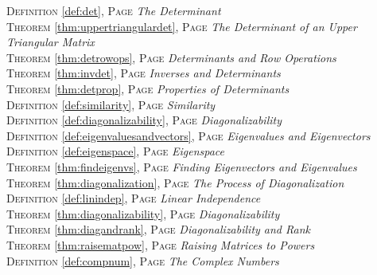 \begin{multicols}{2}
{         \textsc{Definition} \ref{def:det}, \textsc{Page} \pageref{def:det} \textit{The Determinant} \\
         \textsc{Theorem} \ref{thm:uppertriangulardet}, \textsc{Page} \pageref{thm:uppertriangulardet} \textit{The Determinant of an Upper Triangular Matrix} \\
         \textsc{Theorem} \ref{thm:detrowops}, \textsc{Page} \pageref{thm:detrowops} \textit{Determinants and Row Operations} \\
         \textsc{Theorem} \ref{thm:invdet}, \textsc{Page} \pageref{thm:invdet} \textit{Inverses and Determinants} \\
         \textsc{Theorem} \ref{thm:detprop}, \textsc{Page} \pageref{thm:detprop} \textit{Properties of Determinants} \\
         \textsc{Definition} \ref{def:similarity}, \textsc{Page} \pageref{def:similarity} \textit{Similarity} \\
         \textsc{Definition} \ref{def:diagonalizability}, \textsc{Page} \pageref{def:diagonalizability} \textit{Diagonalizability} \\
         \textsc{Definition} \ref{def:eigenvaluesandvectors}, \textsc{Page} \pageref{def:eigenvaluesandvectors} \textit{Eigenvalues and Eigenvectors} \\
         \textsc{Definition} \ref{def:eigenspace}, \textsc{Page} \pageref{def:eigenspace} \textit{Eigenspace} \\
         \textsc{Theorem} \ref{thm:findeigenvs}, \textsc{Page} \pageref{thm:findeigenvs} \textit{Finding Eigenvectors and Eigenvalues} \\
         \textsc{Theorem} \ref{thm:diagonalization}, \textsc{Page} \pageref{thm:diagonalization} \textit{The Process of Diagonalization} \\
         \textsc{Definition} \ref{def:linindep}, \textsc{Page} \pageref{def:linindep} \textit{Linear Independence} \\
         \textsc{Theorem} \ref{thm:diagonalizability}, \textsc{Page} \pageref{thm:diagonalizability} \textit{Diagonalizability} \\
         \textsc{Theorem} \ref{thm:diagandrank}, \textsc{Page} \pageref{thm:diagandrank} \textit{Diagonalizability and Rank} \\
         \textsc{Theorem} \ref{thm:raisematpow}, \textsc{Page} \pageref{thm:raisematpow} \textit{Raising Matrices to Powers} \\
         \textsc{Definition} \ref{def:compnum}, \textsc{Page} \pageref{def:compnum} \textit{The Complex Numbers} \\
}
\end{multicols}
